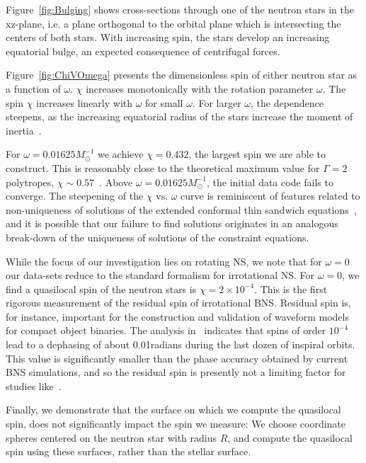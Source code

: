 Figure~\ref{fig:Bulging} shows cross-sections through one of the neutron stars
in the xz-plane, i.e. a plane orthogonal to the orbital plane which is
intersecting the centers of both stars. With increasing spin, the
stars develop an increasing equatorial bulge, an expected consequence of centrifugal forces. 

Figure~\ref{fig:ChiVOmega}
presents the dimensionless spin of either neutron star as a function
of $\omega$. $\chi$ increases monotonically with the rotation
parameter $\omega$. 
The spin $\chi$ increases
linearly with $\omega$ for small $\omega$. For larger $\omega$, the
dependence steepens, as the increasing equatorial radius of the stars
increase the moment of inertia~\citep{Worley:2008cb}. 

For
$\omega=0.01625 M_{\odot}^{-1}$ we achieve $\chi=0.432$, the largest spin we are
able to construct. This is reasonably close to the theoretical
maximum value for $\Gamma=2$ polytropes,
$\chi\sim 0.57$~\citep{Ansorg:2003br}. Above $\omega=0.01625 M_{\odot}^{-1}$,
the initial data code fails to converge. The steepening of the $\chi$
vs. $\omega$ curve is reminiscent of features related to
non-uniqueness of solutions of the extended conformal thin sandwich
equations~\citep{Lovelace2008,Pfeiffer-York:2005,Baumgarte2007,Walsh2007},
and it is possible that our failure to find solutions originates in an analogous
break-down of the uniqueness of solutions of the constraint equations.


While the focus of our investigation lies on rotating NS, we
  note that for $\omega=0$ our data-sets reduce to the standard
  formalism for irrotational NS. For $\omega=0$, we find a
  quasilocal spin of the neutron stars is $\chi=2\times 10^{-4}$.
  This is the first rigorous measurement of the residual spin of
  irrotational BNS. Residual spin is, for instance, important for the
  construction and validation of waveform models for compact object
  binaries. The analysis in~\cite{Boyle2007} indicates that
  spins of order $10^{-4}$ lead to a dephasing of about 0.01radians
  during the last dozen of inspiral orbits. This value is
  significantly smaller than the phase accuracy obtained by current
  BNS simulations, and so the residual spin is presently not a
  limiting factor for studies like~\citep{Bernuzzi:2014owa,Baiotti2011,Baiotti:2010xh}.

Finally, we demonstrate that the surface on which we
compute the quasilocal spin, does not significantly impact the spin
we measure: We choose coordinate spheres centered on the neutron star
with radius $R$, and compute the quasilocal spin using these
surfaces,
rather than the stellar surface.

